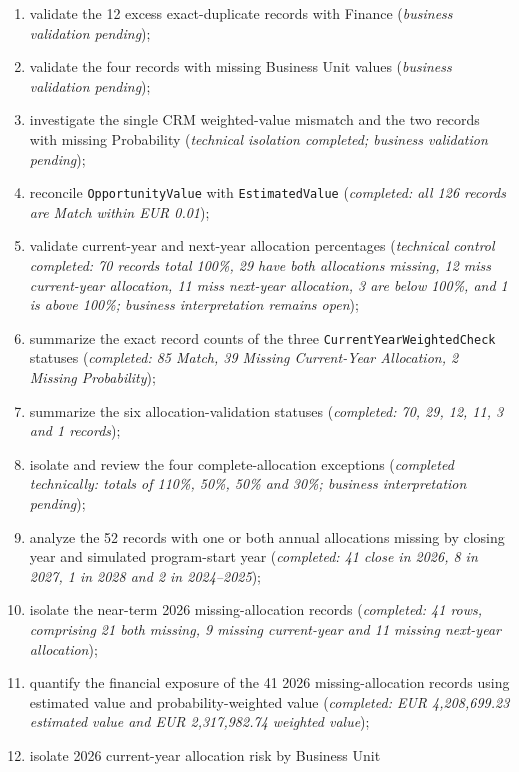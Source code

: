 \documentclass[11pt,a4paper]{article}
\begin{document}
\begin{enumerate}[leftmargin=9mm,itemsep=4pt]
    \item validate the 12 excess exact-duplicate records with Finance
    (\textit{business validation pending});
    \item validate the four records with missing Business Unit values
    (\textit{business validation pending});
    \item investigate the single CRM weighted-value mismatch and the two
    records with missing Probability
    (\textit{technical isolation completed; business validation pending});
    \item reconcile \texttt{OpportunityValue} with \texttt{EstimatedValue}
    (\textit{completed: all 126 records are Match within EUR 0.01});
    \item validate current-year and next-year allocation percentages
    (\textit{technical control completed: 70 records total 100\%, 29 have both
    allocations missing, 12 miss current-year allocation, 11 miss next-year
    allocation, 3 are below 100\%, and 1 is above 100\%; business interpretation
    remains open});
    \item summarize the exact record counts of the three
    \texttt{CurrentYearWeightedCheck} statuses
    (\textit{completed: 85 Match, 39 Missing Current-Year Allocation,
    2 Missing Probability});
    \item summarize the six allocation-validation statuses
    (\textit{completed: 70, 29, 12, 11, 3 and 1 records});
    \item isolate and review the four complete-allocation exceptions
    (\textit{completed technically: totals of 110\%, 50\%, 50\% and 30\%;
    business interpretation pending});
    \item analyze the 52 records with one or both annual allocations missing by
    closing year and simulated program-start year
    (\textit{completed: 41 close in 2026, 8 in 2027, 1 in 2028 and 2 in 2024--2025});
    \item isolate the near-term 2026 missing-allocation records
    (\textit{completed: 41 rows, comprising 21 both missing, 9 missing current-year
    and 11 missing next-year allocation});
    \item quantify the financial exposure of the 41 2026 missing-allocation records
    using estimated value and probability-weighted value
    (\textit{completed: EUR 4,208,699.23 estimated value and
    EUR 2,317,982.74 weighted value});
    \item isolate 2026 current-year allocation risk by Business Unit

\end{enumerate}
\end{document}
